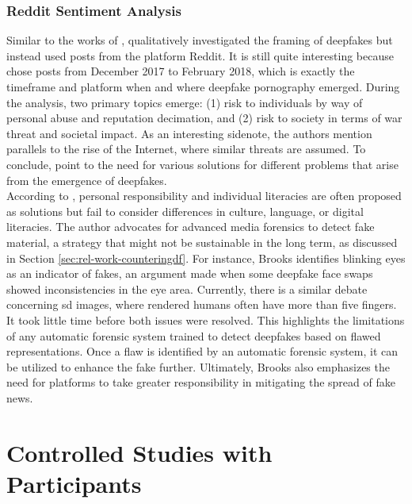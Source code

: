 \documentclass[
  a4paper,  %
  twoside,  %
  bibliography=totoc,
  headsepline,
  cleardoublepage=empty,
  parskip=half,
  draft=false
]{scrbook}
\begin{document}
\subsubsection*{Reddit Sentiment Analysis}
Similar to the works of \citeauthor{leeBelieveNotBelieve2021}, \citeauthor{brooksPopularDiscourseDeepfakes2021} qualitatively investigated the framing of deepfakes but instead used posts from the platform Reddit. It is still quite interesting because \citeauthor{brooksPopularDiscourseDeepfakes2021} chose posts from December 2017 to February 2018, which is exactly the timeframe and platform when and where deepfake pornography emerged. During the analysis, two primary topics emerge: (1) risk to individuals by way of personal abuse and reputation decimation, and (2) risk to society in terms of war threat and societal impact. As an interesting sidenote, the authors mention parallels to the rise of the Internet, where similar threats are assumed. To conclude, \citeauthor{brooksPopularDiscourseDeepfakes2021} point to the need for various solutions for different problems that arise from the emergence of deepfakes. \\
According to \citeauthor{brooksPopularDiscourseDeepfakes2021}, personal responsibility and individual literacies are often proposed as solutions but fail to consider differences in culture, language, or digital literacies. The author advocates for advanced media forensics to detect fake material, a strategy that might not be sustainable in the long term, as discussed in Section \ref{sec:rel-work-counteringdf}. For instance, Brooks identifies blinking eyes as an indicator of fakes, an argument made when some deepfake face swaps showed inconsistencies in the eye area. Currently, there is a similar debate concerning \gls{sd} images, where rendered humans often have more than five fingers. It took little time before both issues were resolved. This highlights the limitations of any automatic forensic system trained to detect deepfakes based on flawed representations. Once a flaw is identified by an automatic forensic system, it can be utilized to enhance the fake further. Ultimately, Brooks also emphasizes the need for platforms to take greater responsibility in mitigating the spread of fake news.

\section{Controlled Studies with Participants}
\label{sec:rel-studypart}
\end{document}
